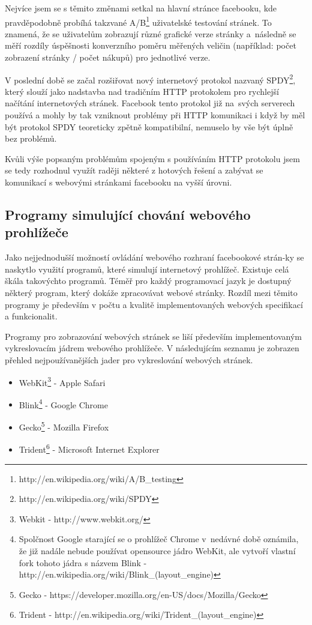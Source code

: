 \documentclass[thesis=M,czech]{FITthesis}[2013/05/10]
\begin{document}
Nejvíce jsem se s těmito změnami setkal na hlavní stránce facebooku, kde pravděpodobně probíhá takzvané A/B\footnote{http://en.wikipedia.org/wiki/A/B\_testing} uživatelské testování stránek. To znamená, že se uživatelům zobrazují různé grafické verze stránky a~následně se měří rozdíly úspěšnosti konverzního poměru měřených veličin (například: počet zobrazení stránky / počet nákupů) pro jednotlivé verze.

V poslední době se začal rozšiřovat nový internetový protokol nazvaný SPDY\footnote{http://en.wikipedia.org/wiki/SPDY}, který slouží jako nadstavba nad tradičním HTTP protokolem pro rychlejší načítání internetových stránek. Facebook tento protokol již na~svých serverech používá a mohly by tak vzniknout problémy při HTTP komunikaci i když by měl být protokol SPDY teoreticky zpětně kompatibilní, nemuselo by vše být úplně bez problémů.

Kvůli výše popsaným problémům spojeným s používáním HTTP protokolu jsem se tedy rozhodnul využít raději některé z hotových řešení a zabývat se komunikací s webovými stránkami facebooku na vyšší úrovni. 

\subsection{Programy simulující chování webového prohlížeče}

Jako nejjednodušší možností ovládání webového rozhraní facebookové strán-ky se naskytlo využití programů, které simulují internetový prohlížeč. Existuje celá škála takovýchto programů. Téměř pro každý programovací jazyk je dostupný některý program, který dokáže zpracovávat webové stránky. Rozdíl mezi těmito programy je především v počtu a kvalitě implementovaných webových specifikací a funkcionalit.

Programy pro zobrazování webových stránek se liší především implementovaným vykreslovacím jádrem webového prohlížeče. V následujícím seznamu je zobrazen přehled nejpoužívanějších jader pro vykreslování webových stránek.

\begin{itemize}
  \item WebKit\footnote{Webkit - http://www.webkit.org/} - Apple Safari
  \item Blink\footnote{Spolčnost Google starající se o prohlížeč Chrome v~nedávné době oznámila, že již nadále nebude používat opensource jádro WebKit, ale vytvoří vlastní fork tohoto jádra s názvem Blink -  http://en.wikipedia.org/wiki/Blink\_(layout\_engine)} - Google Chrome
  \item Gecko\footnote{Gecko - https://developer.mozilla.org/en-US/docs/Mozilla/Gecko} - Mozilla Firefox
  \item Trident\footnote{Trident - http://en.wikipedia.org/wiki/Trident\_(layout\_engine)} - Microsoft Internet Explorer
\end{itemize}
 
\end{document}

